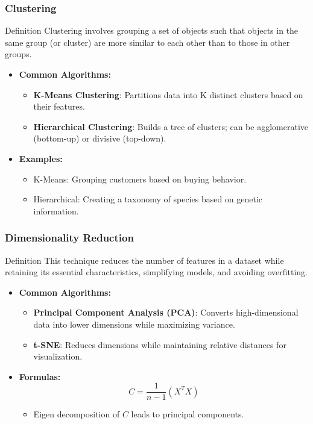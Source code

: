 \documentclass[aspectratio=169]{beamer}
\begin{document}
\begin{frame}
    \frametitle{Clustering}
    \begin{block}{Definition}
        Clustering involves grouping a set of objects such that objects in the same group (or cluster) are more similar to each other than to those in other groups.
    \end{block}
    \begin{itemize}
        \item \textbf{Common Algorithms:}
            \begin{itemize}
                \item \textbf{K-Means Clustering}: Partitions data into K distinct clusters based on their features.
                \item \textbf{Hierarchical Clustering}: Builds a tree of clusters; can be agglomerative (bottom-up) or divisive (top-down).
            \end{itemize}
        \item \textbf{Examples:}
            \begin{itemize}
                \item K-Means: Grouping customers based on buying behavior.
                \item Hierarchical: Creating a taxonomy of species based on genetic information.
            \end{itemize}
    \end{itemize}
\end{frame}

\begin{frame}
    \frametitle{Dimensionality Reduction}
    \begin{block}{Definition}
        This technique reduces the number of features in a dataset while retaining its essential characteristics, simplifying models, and avoiding overfitting.
    \end{block}
    \begin{itemize}
        \item \textbf{Common Algorithms:}
            \begin{itemize}
                \item \textbf{Principal Component Analysis (PCA)}: Converts high-dimensional data into lower dimensions while maximizing variance.
                \item \textbf{t-SNE}: Reduces dimensions while maintaining relative distances for visualization.
            \end{itemize}
        \item \textbf{Formulas:}
            \begin{equation}
                C = \frac{1}{n-1} (X^T X)
            \end{equation}
            \begin{itemize}
                \item Eigen decomposition of \( C \) leads to principal components.
            \end{itemize}
    \end{itemize}
\end{frame}
\end{document}
